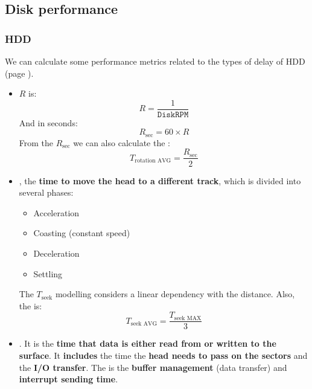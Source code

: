 \subsection{Disk performance}

\subsubsection{HDD}

We can calculate some performance metrics related to the types of delay of HDD (page \pageref{four types of hdd delay}).
\begin{itemize}
    \item {} $R$ is:
    \begin{equation}
        R = \dfrac{1}{\texttt{DiskRPM}}
    \end{equation}
    And in seconds:
    \begin{equation}
        R_{\text{sec}} = 60 \times R
    \end{equation}
    From the $R_{\text{sec}}$ we can also calculate the :
    \begin{equation}
        T_{\text{rotation AVG}} = \dfrac{R_{\text{sec}}}{2}
    \end{equation}

    \item {}, the \textbf{time to move the head to a different track}, which is divided into several phases:
    \begin{itemize}
        \item Acceleration
        \item Coasting (constant speed)
        \item Deceleration
        \item Settling
    \end{itemize}
    The $T_{\text{seek}}$ modelling considers a linear dependency with the distance. Also, the  is:
    \begin{equation}
        T_{\text{seek AVG}} = \dfrac{T_{\text{seek MAX}}}{3}
    \end{equation}

    \item {}. It is the \textbf{time that data is either read from or written to the surface}. It \textbf{includes} the time the \textbf{head needs to pass on the sectors} and the \textbf{I/O transfer}. The  is the \textbf{buffer management} (data transfer) and \textbf{interrupt sending time}.


\end{itemize}
